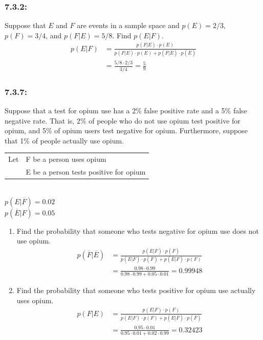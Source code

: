 \documentclass[a4paper]{article}
\begin{document}
	\subsubsection*{7.3.2:}
	Suppose that $E$ and $F$ are events in a sample space and $p(E) = 2/3$, $p(F)=3/4$, and $p(F|E)=5/8$. Find $p(E|F)$.
	\begin{align*}
	    p(E|F) & = \frac{p(F|E)\cdot p(E)}{p(F|E)\cdot p(E) + p(F|\overline{E})\cdot p(\overline{E})} \\
	    & = \frac{5/8 \cdot 2/3}{3/4} = \frac{5}{9}
	\end{align*}
	
	\subsubsection*{7.3.7:}
	Suppose that a test for opium use has a 2\% false positive rate and a 5\% false negative rate. That is, 2\% of people who do not use opium test positive for opium, and 5\% of opium users test negative for opium. Furthermore, suppose that 1\% of people actually use opium. \\
	\begin{tabular}{r l}
	     Let &F be a person uses opium \\
	     &E be a person tests positive for opium
	\end{tabular} \\
	$p(E|\overline{F}) = 0.02$ \\
	$p(\overline{E}|F) = 0.05$
	\begin{enumerate}[label=\alph*)]
	    \item Find the probability that someone who tests negative for opium use does not use opium.
	    \begin{align*}
	    p(\overline{F}|\overline{E}) & = \frac{p(\overline{E}|\overline{F})\cdot p(\overline{F})}{p(\overline{E}|\overline{F})\cdot p(\overline{F}) + p(\overline{E}|F)\cdot p(F)} \\
	    & = \frac{0.98 \cdot 0.99}{0.98\cdot0.99+0.05\cdot0.01} = 0.99948
	\end{align*}
	    \item Find the probability that someone who tests positive for opium use actually uses opium.
	    \begin{align*}
	    p(F|E) & = \frac{p(E|F)\cdot p(F)}{p(E|F)\cdot p(F) + p(E|\overline{F})\cdot p(\overline{F})} \\
	    & = \frac{0.95\cdot0.01}{0.95\cdot0.01+0.02\cdot0.99} = 0.32423
	\end{align*}
	\end{enumerate}
	
\end{document}
